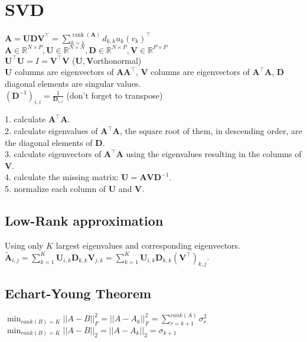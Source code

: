 \section{SVD}
$\mathbf{A} = \mathbf{U} \mathbf{D} \mathbf{V}^\top = \sum_{k=1}^{\operatorname{rank}(\mathbf{A})} d_{k,k} u_k (v_k)^\top$\\
$\mathbf{A} \in \mathbb{R}^{N \times P}, \mathbf{U} \in \mathbb{R}^{N \times N}, \mathbf{D} \in \mathbb{R}^{N \times P}, \mathbf{V} \in \mathbb{R}^{P \times P}$\\
$\mathbf{U}^\top \mathbf{U} = I = \mathbf{V}^\top \mathbf{V}$ ($\mathbf{U}, \mathbf{V}$orthonormal)\\
$\mathbf{U}$ columns are eigenvectors of $\mathbf{A} \mathbf{A}^\top$, $\mathbf{V}$ columns are eigenvectors of $\mathbf{A}^\top \mathbf{A}$, $\mathbf{D}$ diagonal elements are singular values.\\
$(\mathbf{D}^{-1})_{i,i} = \frac{1}{\mathbf{D}_{i, i}}$ (don't forget to transpose)

1. calculate $\mathbf{A}^\top \mathbf{A}$.\\
2. calculate eigenvalues of $\mathbf{A}^\top \mathbf{A}$, the square root of them, in descending order, are the diagonal elements of $\mathbf{D}$.\\
3. calculate eigenvectors of $\mathbf{A}^\top \mathbf{A}$ using the eigenvalues resulting in the columns of $\mathbf{V}$.\\
4. calculate the missing matrix: $\mathbf{U} = \mathbf{A} \mathbf{V} \mathbf{D}^{-1}$.\\
5. normalize each column of $\mathbf{U}$ and $\mathbf{V}$.

\subsection*{Low-Rank approximation}
Using only $K$ largest eigenvalues and corresponding eigenvectors. $\tilde{\mathbf{A}}_{i, j} = \sum_{k=1}^K \mathbf{U}_{i, k} \mathbf{D}_{k,k} \mathbf{V}_{j, k} = \sum_{k=1}^K \mathbf{U}_{i, k} \mathbf{D}_{k,k} (\mathbf{V}^\top)_{k, j}$.

\subsection*{Echart-Young Theorem}
$\min_{rank(B)=K} ||A-B||_F^2 = ||A-A_k||_F^2 = \sum_{r=k+1}^{rank(A)} \sigma_r^2$
$\min_{rank(B)=K} ||A-B||_2 = ||A-A_k||_2 = \sigma_{k+1}$
